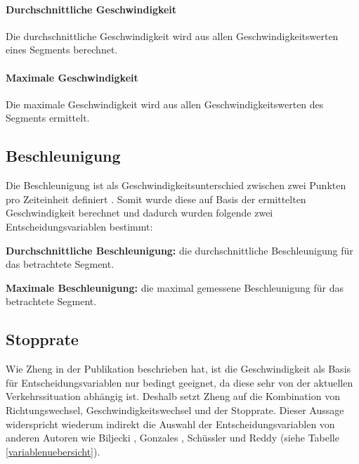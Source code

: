 \paragraph{Durchschnittliche Geschwindigkeit} Die durchschnittliche Geschwindigkeit wird aus allen Geschwindigkeitswerten eines Segments berechnet.

\paragraph{Maximale Geschwindigkeit} Die maximale Geschwindigkeit wird aus allen Geschwindigkeitswerten des Segments ermittelt.

\subsection{Beschleunigung}
Die Beschleunigung ist als Geschwindigkeitsunterschied zwischen zwei Punkten pro Zeiteinheit definiert \cite[S.~51]{douglas_giancoli_physik_2010}. Somit wurde diese auf Basis der ermittelten Geschwindigkeit berechnet und dadurch wurden folgende zwei Entscheidungsvariablen bestimmt:

\begin{pitemize}
\item \textbf{Durchschnittliche Beschleunigung:} die durchschnittliche Beschleunigung für das betrachtete Segment. 
\item \textbf{Maximale Beschleunigung:} die maximal gemessene Beschleunigung für das betrachtete Segment.
\end{pitemize}

\subsection{Stopprate}
\label{stopprate}
Wie Zheng in der Publikation  \cite{zheng_understanding_2010} beschrieben hat, ist die Geschwindigkeit als Basis für Entscheidungsvariablen nur bedingt geeignet, da diese sehr von der aktuellen Verkehrssituation abhängig ist. Deshalb setzt Zheng auf die Kombination von Richtungswechsel, Geschwindigkeitswechsel und der Stopprate. Dieser Aussage widerspricht wiederum indirekt die Auswahl der Entscheidungsvariablen von anderen Autoren wie Biljecki  \cite{biljecki_transportation_2013}, Gonzales \cite{gonzalez_automating_2010}, Schüssler \cite{nadine_schussler_improving_2011} und Reddy \cite{reddy_using_2010} (siehe Tabelle \ref{variablenuebersicht}). 

